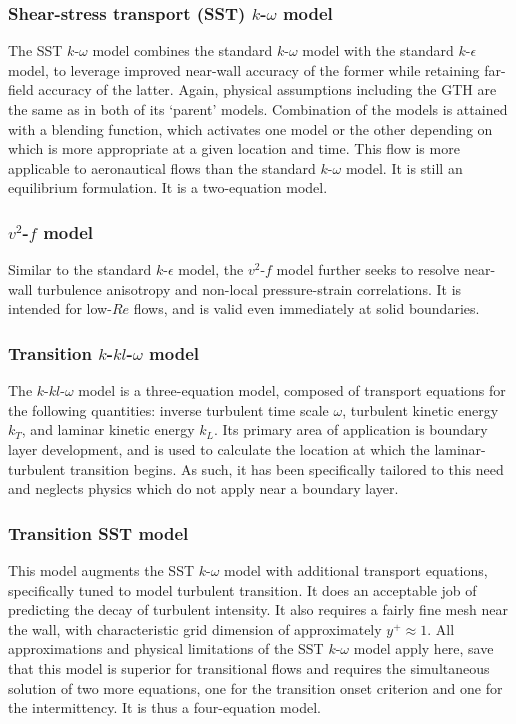 \documentclass[11pt]{article}
\begin{document}
\subsubsection{Shear-stress transport (SST) $k$-$\omega$ model}

The SST $k$-$\omega$ model combines the standard $k$-$\omega$ model with the standard $k$-$\epsilon$ model, to leverage improved near-wall accuracy of the former while retaining far-field accuracy of the latter. Again, physical assumptions including the GTH are the same as in both of its `parent' models. Combination of the models is attained with a blending function, which activates one model or the other depending on which is more appropriate at a given location and time. This flow is more applicable to aeronautical flows than the standard $k$-$\omega$ model. It is still an equilibrium formulation. It is a two-equation model.

\subsubsection{$v^2$-$f$ model}

Similar to the standard $k$-$\epsilon$ model, the $v^2$-$f$ model further seeks to resolve near-wall turbulence anisotropy and non-local pressure-strain correlations. It is intended for low-$Re$ flows, and is valid even immediately at solid boundaries.

\subsubsection{Transition $k$-$kl$-$\omega$ model}

The $k$-$kl$-$\omega$ model is a three-equation model, composed of transport equations for the following quantities: inverse turbulent time scale $\omega$, turbulent kinetic energy $k_T$, and laminar kinetic energy $k_L$. Its primary area of application is boundary layer development, and is used to calculate the location at which the laminar-turbulent transition begins. As such, it has been specifically tailored to this need and neglects physics which do not apply near a boundary layer.

\subsubsection{Transition SST model}

This model augments the SST $k$-$\omega$ model with additional transport equations, specifically tuned to model turbulent transition. It does an acceptable job of predicting the decay of turbulent intensity. It also requires a fairly fine mesh near the wall, with characteristic grid dimension of approximately $y^+ \approx 1$. All approximations and physical limitations of the SST $k$-$\omega$ model apply here, save that this model is superior for transitional flows and requires the simultaneous solution of two more equations, one for the transition onset criterion and one for the intermittency. It is thus a four-equation model.
\end{document}
